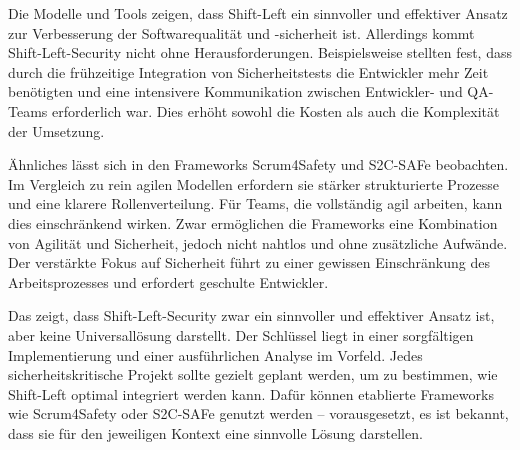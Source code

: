 Die Modelle und Tools zeigen, dass Shift-Left ein sinnvoller und effektiver Ansatz zur Verbesserung der Softwarequalität und -sicherheit ist. Allerdings kommt Shift-Left-Security nicht ohne Herausforderungen. Beispielsweise stellten \citet{andriadi_impact_2023} fest, dass durch die frühzeitige Integration von Sicherheitstests die Entwickler mehr Zeit benötigten und eine intensivere Kommunikation zwischen Entwickler- und QA-Teams erforderlich war. Dies erhöht sowohl die Kosten als auch die Komplexität der Umsetzung.

Ähnliches lässt sich in den Frameworks Scrum4Safety und S2C-SAFe beobachten. Im Vergleich zu rein agilen Modellen erfordern sie stärker strukturierte Prozesse und eine klarere Rollenverteilung. Für Teams, die vollständig agil arbeiten, kann dies einschränkend wirken. Zwar ermöglichen die Frameworks eine Kombination von Agilität und Sicherheit, jedoch nicht nahtlos und ohne zusätzliche Aufwände. Der verstärkte Fokus auf Sicherheit führt zu einer gewissen Einschränkung des Arbeitsprozesses und erfordert geschulte Entwickler.

Das zeigt, dass Shift-Left-Security zwar ein sinnvoller und effektiver Ansatz ist, aber keine Universallösung darstellt. Der Schlüssel liegt in einer sorgfältigen Implementierung und einer ausführlichen Analyse im Vorfeld. Jedes sicherheitskritische Projekt sollte gezielt geplant werden, um zu bestimmen, wie Shift-Left optimal integriert werden kann. Dafür können etablierte Frameworks wie Scrum4Safety oder S2C-SAFe genutzt werden – vorausgesetzt, es ist bekannt, dass sie für den jeweiligen Kontext eine sinnvolle Lösung darstellen.